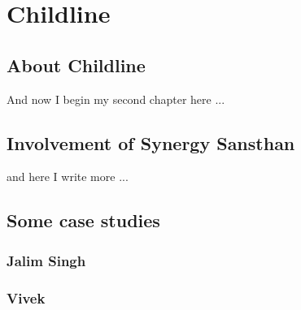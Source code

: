 \chapter{Childline}
\ifpdf
    \graphicspath{{Chapter2/Chapter2Figs/PNG/}{Chapter2/Chapter2Figs/PDF/}{Chapter2/Chapter2Figs/}}
\else
    \graphicspath{{Chapter2/Chapter2Figs/EPS/}{Chapter2/Chapter2Figs/}}
\fi

\section{About Childline}
And now I begin my second chapter here ...

\section{Involvement of Synergy Sansthan}
and here I write more ...

\section{Some case studies}
\subsection{Jalim Singh}

\subsection{Vivek}






